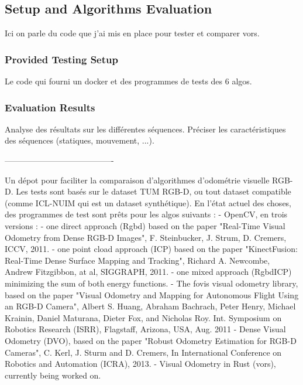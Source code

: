 \subsection{Setup and Algorithms Evaluation}%
\label{sub:algorithms_eval}

Ici on parle du code que j'ai mis en place pour tester et comparer vors.

\subsubsection{Provided Testing Setup}%
\label{ssub:setup}

Le code qui fourni un docker et des programmes de tests des 6 algos.

\subsubsection{Evaluation Results}%
\label{ssub:eval_results}

Analyse des résultats sur les différentes séquences.
Préciser les caractéristiques des séquences (statiques, mouvement, ...).


----------------------------------------

Un dépot pour faciliter la comparaison d’algorithmes d’odométrie visuelle RGB-D. Les tests sont basés sur le dataset TUM RGB-D, ou tout dataset compatible (comme ICL-NUIM qui est un dataset synthétique). En l’état actuel des choses, des programmes de test sont prêts pour les algos suivants :
- OpenCV, en trois versions :
  - one direct approach (Rgbd) based on the paper "Real-Time Visual Odometry from Dense RGB-D Images", F. Steinbucker, J. Strum, D. Cremers, ICCV, 2011.
  - one point cload approach (ICP) based on the paper "KinectFusion: Real-Time Dense Surface Mapping and Tracking", Richard A. Newcombe, Andrew Fitzgibbon, at al, SIGGRAPH, 2011.
  - one mixed approach (RgbdICP) minimizing the sum of both energy functions.
- The fovis visual odometry library, based on the paper "Visual Odometry and Mapping for Autonomous Flight Using an RGB-D Camera", Albert S. Huang, Abraham Bachrach, Peter Henry, Michael Krainin, Daniel Maturana, Dieter Fox, and Nicholas Roy. Int. Symposium on Robotics Research (ISRR), Flagstaff, Arizona, USA, Aug. 2011
- Dense Visual Odometry (DVO), based on the paper "Robust Odometry Estimation for RGB-D Cameras", C. Kerl, J. Sturm and D. Cremers, In International Conference on Robotics and Automation (ICRA), 2013.
- Visual Odometry in Rust (vors), currently being worked on.

